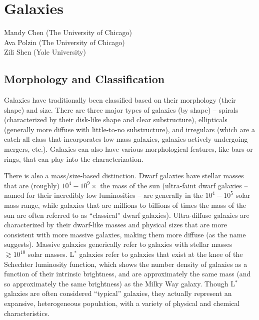 \section{Galaxies}

\begin{sectionauthor}
     Mandy Chen (The University of Chicago) \\
     Ava Polzin (The University of Chicago) \\
     Zili Shen (Yale University)
\end{sectionauthor}
\vspace{20pt}

\subsection{Morphology and Classification}

Galaxies have traditionally been classified based on their morphology (their shape) and size. There are three major types of galaxies (by shape) -- spirals (characterized by their disk-like shape and clear substructure), ellipticals (generally more diffuse with little-to-no substructure), and irregulars (which are a catch-all class that incorporates low mass galaxies, galaxies actively undergoing mergers, etc.). Galaxies can also have various morphological features, like bars or rings, that can play into the characterization.

There is also a mass/size-based distinction. Dwarf galaxies have stellar masses that are (roughly) $10^4 - 10^9 \times$ the mass of the sun (ultra-faint dwarf galaxies -- named for their incredibly low luminosities -- are generally in the $10^4 - 10^5$ solar mass range, while galaxies that are millions to billions of times the mass of the sun are often referred to as ``classical'' dwarf galaxies). Ultra-diffuse galaxies are characterized by their dwarf-like masses and physical sizes that are more consistent with more massive galaxies, making them more diffuse (as the name suggests). Massive galaxies generically refer to galaxies with stellar masses $\gtrsim 10^{10}$ solar masses. L$^*$ galaxies refer to galaxies that exist at the knee of the Schechter luminosity function, which shows the number density of galaxies as a function of their intrinsic brightness, and are approximately the same mass (and so approximately the same brightness) as the Milky Way galaxy. Though L$^*$ galaxies are often considered ``typical'' galaxies, they actually represent an expansive, heterogeneous population, with a variety of physical and chemical characteristics.

